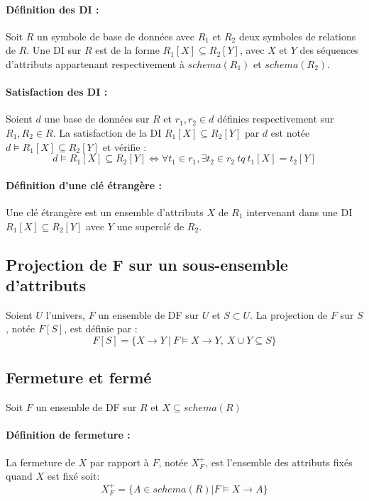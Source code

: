 \documentclass[10pt,a4paper]{article}
\begin{document}
\paragraph{Définition des DI :} Soit $R$ un symbole de base de données avec $R_{1}$ et $R_{2}$ deux symboles de relations de $R$. Une DI sur $R$ est de la forme $R_{1}[X] \subseteq R_{2}[Y]$, avec $X$ et $Y$ des séquences d'attributs appartenant respectivement à $schema(R_{1})$ et $schema(R_{2})$.

\paragraph{Satisfaction des DI :} Soient $d$ une base de données sur $R$ et $r_{1},r_{2} \in d$ définies respectivement sur $R_{1},R_{2} \in R$. La satisfaction de la DI $R_{1}[X] \subseteq R_{2}[Y]$ par $d$ est notée $d \models R_{1}[X] \subseteq R_{2}[Y]$ et vérifie : 
$$d \models R_{1}[X] \subseteq R_{2}[Y] \Leftrightarrow \forall t_{1} \in r_{1}, \exists t_{2} \in r_{2} \ tq \ t_{1}[X]=t_{2}[Y]$$

\paragraph{Définition d'une clé étrangère :} Une clé étrangère est un ensemble d'attributs $X$ de $R_{1}$ intervenant dans une DI $R_{1}[X] \subseteq R_{2}[Y]$ avec $Y$ une superclé de $R_{2}$.

\subsection{Projection de F sur un sous-ensemble d'attributs}
Soient $U$ l'univers, $F$ un ensemble de DF sur $U$ et $S \subset U$. La projection de $F$ sur $S$, notée $F[S]$, est définie par :
$$F[S] = \{X \rightarrow Y \ | \ F \models X \rightarrow Y, \ X \cup Y \subseteq S \}$$


\subsection{Fermeture et fermé}
Soit $F$ un ensemble de DF sur $R$ et $X \subseteq schema(R)$ 

\paragraph{Définition de fermeture :} La fermeture de $X$ par rapport à $F$, notée $X_{F}^{+}$, est l'ensemble des attributs fixés quand $X$ est fixé soit:
$$X_{F}^{+} = \{A \in schema(R) | F \models X \rightarrow A\}$$
\end{document}
